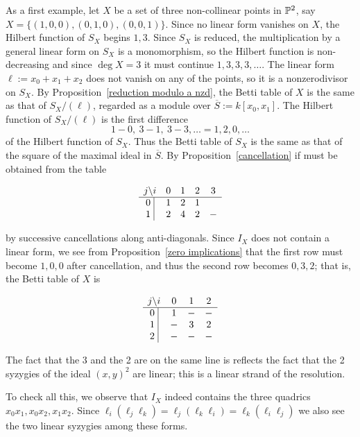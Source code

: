 \begin{example}\label{3 points in P2}
As a first example, let $X$ be a set of three non-collinear points in ${\mathbb P}^2$, say
$X = \{(1,0,0), (0,1,0), (0,0,1)\}$. Since no linear form vanishes on $X$, the Hilbert function of $S_{X}$ begins $1,3$. Since $S_{X}$ is reduced, the multiplication by a general linear form on $S_{X}$ is a monomorphism, so the Hilbert function is non-decreasing and since $\deg X = 3$ it must continue $1,3,3,3,\dots$. The linear form 
$\ell :=x_{0}+x_{1}+x_{2}$ does not vanish on any of the points, so it is a nonzerodivisor on $S_{X}$. By Proposition~\ref{reduction modulo a nzd}, the Betti table of $X$ is the same as that of 
$S_{X}/(\ell)$, regarded as a module over $\overline S := k[x_{0}, x_{1}]$. The Hilbert function of $S_{X}/(\ell)$ is the first difference 
$$
1-0,\ 3-1,\ 3-3,\dots = 1,2,0,\dots
$$
of the Hilbert function of $S_{X}$. Thus the Betti table of $S_{X}$ is the same as that of the square of the maximal ideal in $\overline S$. By Proposition~\ref{cancellation} if must be obtained from the table
\begin{small}
$$
\begin{matrix}
j \backslash i &0&1&2&3\\ \hline
\text{0 }\vline &1&2&1\\
\text{1 }\vline &2&4&2&-\\
\end{matrix}
$$
\end{small}
by successive cancellations along anti-diagonals. Since $I_{X}$ does not contain a linear form, we see from Proposition~\ref{zero implications} that the first row
must become $1,0,0$ after cancellation, and thus the second row becomes
$0,3,2$; that is, the Betti table of $X$ is
\begin{small}
$$
\begin{matrix}
j \backslash i     &0&1&2\\ \hline
\text{0 }\vline &1&-&-\\
\text{1 }\vline &-&3&2\\
\text{2 }\vline &-&-&-\\
\end{matrix}
$$
\end{small}
The fact that the 3 and the 2 are on the same line is reflects the fact that the 2 syzygies of the ideal $(x,y)^{2}$ are linear; this is a linear strand of the resolution. 

To check all this, we observe that $I_{X}$ indeed contains the three quadrics $x_{0}x_{1}, x_{0}x_{2}, x_{1}x_{2}$.
Since $ \ell_i(\ell_j\ell_k) = \ell_j(\ell_k\ell_i) = \ell_k(\ell_i\ell_j)$ we also see the
 two linear syzygies among these forms. 
 

\end{example}
